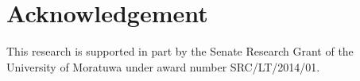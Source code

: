 \section{Acknowledgement}
This research is supported in part by the Senate Research Grant of the University of Moratuwa under award number SRC/LT/2014/01.